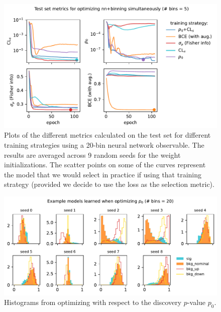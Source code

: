 \documentclass[
  11pt,
  numbers=noendperiod]{book}
\begin{document}
\begin{figure}

{\centering \includegraphics{./images/test_metricsfewbins.pdf}

}

\caption{Plots of the different metrics calculated on the test set for
different training strategies using a 20-bin neural network observable.
The results are averaged across 9 random seeds for the weight
initializations. The scatter points on some of the curves represent the
model that we would select in practice if using that training strategy
(provided we decide to use the loss as the selection metric).}

\end{figure}


\begin{figure}

{\centering \includegraphics{./images/new-hist-models-discovery-20bin.pdf}

}

\caption{Histograms from optimizing with respect to the discovery
\(p\)-value \(p_0\).}

\end{figure}
\end{document}
